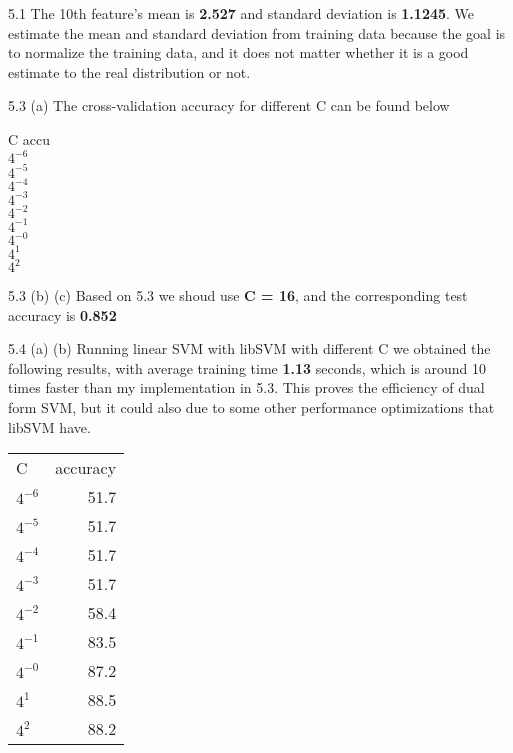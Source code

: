 \documentclass[12pt]{article}
\newenvironment{problem}[2][Problem]{\begin{trivlist}
\item[\hskip \labelsep {\bfseries #1}\hskip \labelsep {\bfseries #2}]}{\end{trivlist}}
\begin{document}
\begin{problem}{5. Programming}
\item{5.1}
The 10th feature's mean is \textbf{2.527} and standard deviation is \textbf{1.1245}. We estimate the mean and standard deviation from training data because the goal is to normalize the training data, and it does not matter whether it is a good estimate to the real distribution or not.
\item{5.3 (a)}
The cross-validation accuracy for different C can be found below
\begin{center}
	C     \:\: accu\\
	$4^{-6}$ \\
	$4^{-5}$ \\
	$4^{-4}$ \\
	$4^{-3}$ \\
	$4^{-2}$ \\
	$4^{-1}$ \\
	$4^{-0}$ \\
	$4^1$ \:\:\\
	$4^2$ \:\:\\
\end{center}
\item{5.3 (b) (c)}
Based on 5.3 we shoud use \textbf{C = 16}, and the corresponding test accuracy is \textbf{0.852}
\item{5.4 (a) (b)}
Running linear SVM with libSVM with different C we obtained the following results, with average training time \textbf{1.13} seconds, which is around 10 times faster than my implementation in 5.3. This proves the efficiency of dual form SVM, but it could also due to some other performance optimizations that libSVM have. 
\begin{center}
\begin{tabular}{ l | r}
    C &  accuracy\\
    $4^{-6}$  & 51.7\\
    $4^{-5}$  & 51.7\\
    $4^{-4}$  & 51.7\\
    $4^{-3}$  & 51.7\\
    $4^{-2}$  & 58.4\\
    $4^{-1}$  & 83.5\\
    $4^{-0}$  & 87.2\\
    $4^{1}$  & 88.5\\
    $4^{2}$  & 88.2\\
\end{tabular}
\end{center}


\end{problem}
\end{document}
